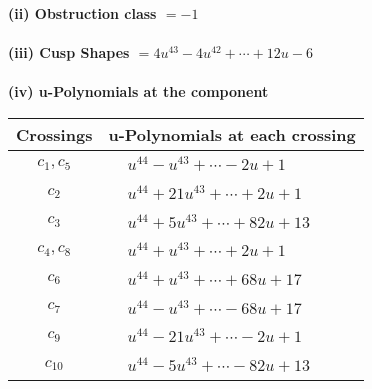 \documentclass[1p]{elsarticle_modified}
\theoremstyle{definition}
\begin{document}
\flushleft \textbf{(ii) Obstruction class $= -1$}\\~\\
\flushleft \textbf{(iii) Cusp Shapes $= 4 u^{43}-4 u^{42}+\cdots+12 u-6$}\\~\\
\newpage\renewcommand{\arraystretch}{1}
\flushleft \textbf{(iv) u-Polynomials at the component}\newline \\
\begin{tabular}{m{50pt}|m{274pt}}
Crossings & \hspace{64pt}u-Polynomials at each crossing \\
\hline $$\begin{aligned}c_{1},c_{5}\end{aligned}$$&$\begin{aligned}
&u^{44}- u^{43}+\cdots-2 u+1
\end{aligned}$\\
\hline $$\begin{aligned}c_{2}\end{aligned}$$&$\begin{aligned}
&u^{44}+21 u^{43}+\cdots+2 u+1
\end{aligned}$\\
\hline $$\begin{aligned}c_{3}\end{aligned}$$&$\begin{aligned}
&u^{44}+5 u^{43}+\cdots+82 u+13
\end{aligned}$\\
\hline $$\begin{aligned}c_{4},c_{8}\end{aligned}$$&$\begin{aligned}
&u^{44}+u^{43}+\cdots+2 u+1
\end{aligned}$\\
\hline $$\begin{aligned}c_{6}\end{aligned}$$&$\begin{aligned}
&u^{44}+u^{43}+\cdots+68 u+17
\end{aligned}$\\
\hline $$\begin{aligned}c_{7}\end{aligned}$$&$\begin{aligned}
&u^{44}- u^{43}+\cdots-68 u+17
\end{aligned}$\\
\hline $$\begin{aligned}c_{9}\end{aligned}$$&$\begin{aligned}
&u^{44}-21 u^{43}+\cdots-2 u+1
\end{aligned}$\\
\hline $$\begin{aligned}c_{10}\end{aligned}$$&$\begin{aligned}
&u^{44}-5 u^{43}+\cdots-82 u+13
\end{aligned}$\\
\hline
\end{tabular}\\~\\
\end{document}
